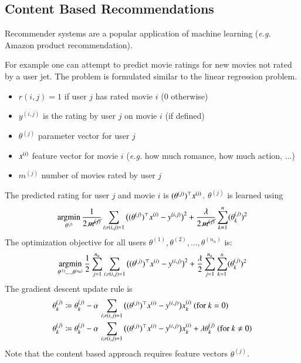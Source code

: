 \documentclass[a4paper,twoside,10pt]{article}
\begin{document}
\subsection{Content Based Recommendations}
Recommender systems are a popular application of machine learning (\emph{e.g.} Amazon product recommendation).

For example one can attempt to predict movie ratings for new movies not rated by a user jet.
The problem is formulated similar to the linear regression problem.
\begin{itemize}
  \item $r(i,j)=1$ if user $j$ has rated movie $i$ ($0$ otherwise)
  \item $y^{(i,j)}$ is the rating by user $j$ on movie $i$ (if defined)
  \item $\theta^{(j)}$ parameter vector for user $j$
  \item $x^{(i)}$ feature vector for movie $i$ (\emph{e.g.} how much romance, how much action, ...)
  \item $m^{(j)}$ number of movies rated by user $j$
\end{itemize}
The predicted rating for user $j$ and movie $i$ is $(\theta^{(j)})^\top x^{(i)}$.
$\theta^{(j)}$ is learned using
\begin{equation*}
  \mathop{\operatorname{argmin}}_{\theta^{(j)}}\frac{1}{2\,\cancel{m^{(j)}}}\sum_{i;r(i,j)=1}\big((\theta^{(j)})^\top x^{(i)}-y^{(i,j)}\big)^2+\frac{\lambda}{2\,\cancel{m^{(j)}}}\sum_{k=1}^n(\theta^{(j)}_k)^2
\end{equation*}
The optimization objective for all users $\theta^{(1)},\theta^{(2)},\ldots,\theta^{(n_u)}$ is:
\begin{equation*}
  \mathop{\operatorname{argmin}}_{\theta^{(1)},\ldots,\theta^{(n_u)}}\frac{1}{2}\sum_{j=1}^{n_u}\sum_{i;r(i,j)=1}\big((\theta^{(j)})^\top x^{(i)}-y^{(i,j)}\big)^2+\frac{\lambda}{2}\sum_{j=1}^{n_u}\sum_{k=1}^n(\theta^{(j)}_k)^2
\end{equation*}
The gradient descent update rule is
\begin{align*}
  \begin{split}
    \theta_k^{(j)}&\coloneqq\theta_k^{(j)}-\alpha\,\sum_{i;r(i,j)=1}\big((\theta^{(j)})^\top\sxi-y^{(i,j)}\big)\sxi_k\ (\mathrm{for\ }k=0)\\
    \theta_k^{(j)}&\coloneqq\theta_k^{(j)}-\alpha\,\sum_{i;r(i,j)=1}\big((\theta^{(j)})^\top\sxi-y^{(i,j)}\big)\sxi_k+\lambda\theta^{(j)}_k\ (\mathrm{for\ }k\ne 0)
  \end{split}
\end{align*}
Note that the content based approach requires feature vectors $\theta^{(j)}$.
\end{document}
